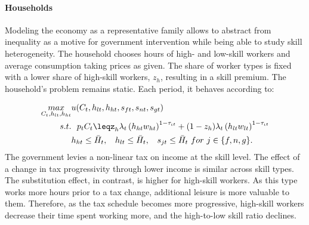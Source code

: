 \paragraph{Households}
Modeling the economy as a representative family allows to abstract from inequality as a motive for government intervention while being able to study skill heterogeneity.
 The household chooses hours of high- and low-skill workers and average consumption taking prices as given. The share of worker types is fixed with a lower share of high-skill workers, $z_h$, resulting in a skill premium. The household's problem remains static. Each period, it behaves according to: %

\begin{align}
\underset{C_{t}, h_{lt}, h_{ht}}{max}&
u(C_{t}, h_{lt}, h_{ht}, s_{ft}, s_{nt}, s_{gt})\\
s.t.& \ \ p_{t}C_{t}\leq%
z_h\lambda_t \left(h_{ht}w_{ht}\right)^{1-\tau_{\iota t}}+(1-z_h)\lambda_t\left(h_{lt}w_{lt}\right)^{1-\tau_{\iota t}}\\ %
\ & h_{ht}\leq \bar{H}_t,\ \hspace{2mm} h_{lt}\leq \bar{H}_t,\ \hspace{2mm}  s_{jt}\leq \bar{H}_t \ for\ j\in\{f,n,g\}.
\end{align}
The government levies a non-linear tax on income at the skill level. 
The effect of a change in tax progressivity through lower income is similar across skill types. The substitution effect, in contrast, is higher for high-skill workers. As this type works more hours prior to a tax change, additional leisure is more valuable to them. Therefore, as the tax schedule becomes more progressive, high-skill workers decrease their time spent working more, and the high-to-low skill ratio declines. 


